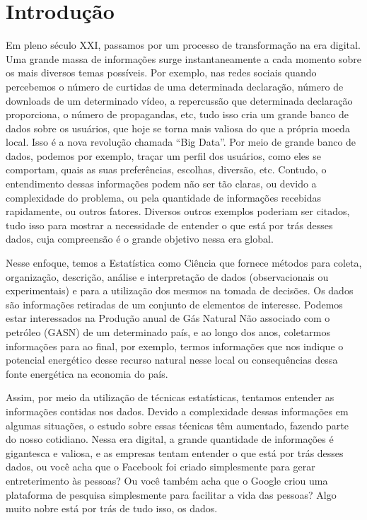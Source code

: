 \documentclass[
]{book}
\begin{document}
\hypertarget{introduuxe7uxe3o}{%
\section{Introdução}\label{introduuxe7uxe3o}}

Em pleno século XXI, passamos por um processo de transformação na era digital. Uma grande massa de informações surge instantaneamente a cada momento sobre os mais diversos temas possíveis. Por exemplo, nas redes sociais quando percebemos o número de curtidas de uma determinada declaração, número de downloads de um determinado vídeo, a repercussão que determinada declaração proporciona, o número de propagandas, etc, tudo isso cria um grande banco de dados sobre os usuários, que hoje se torna mais valiosa do que a própria moeda local. Isso é a nova revolução chamada ``Big Data''. Por meio de grande banco de dados, podemos por exemplo, traçar um perfil dos usuários, como eles se comportam, quais as suas preferências, escolhas, diversão, etc. Contudo, o entendimento dessas informações podem não ser tão claras, ou devido a complexidade do problema, ou pela quantidade de informações recebidas rapidamente, ou outros fatores. Diversos outros exemplos poderiam ser citados, tudo isso para mostrar a necessidade de entender o que está por trás desses dados, cuja compreensão é o grande objetivo nessa era global.

Nesse enfoque, temos a Estatística como Ciência que fornece métodos para coleta, organização, descrição, análise e interpretação de dados (observacionais ou experimentais) e para a utilização dos mesmos na tomada de decisões. Os dados são informações retiradas de um conjunto de elementos de interesse. Podemos estar interessados na Produção anual de Gás Natural Não associado com o petróleo (GASN) de um determinado país, e ao longo dos anos, coletarmos informações para ao final, por exemplo, termos informações que nos indique o potencial energético desse recurso natural nesse local ou consequências dessa fonte energética na economia do país.

Assim, por meio da utilização de técnicas estatísticas, tentamos entender as informações contidas nos dados. Devido a complexidade dessas informações em algumas situações, o estudo sobre essas técnicas têm aumentado, fazendo parte do nosso cotidiano. Nessa era digital, a grande quantidade de informações é gigantesca e valiosa, e as empresas tentam entender o que está por trás desses dados, ou você acha que o Facebook foi criado simplesmente para gerar entreterimento às pessoas? Ou você também acha que o Google criou uma plataforma de pesquisa simplesmente para facilitar a vida das pessoas? Algo muito nobre está por trás de tudo isso, os dados.
\end{document}
